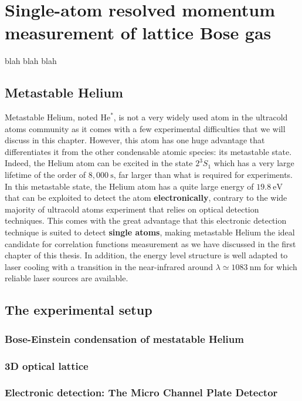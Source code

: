 \chapter{Single-atom resolved momentum measurement of lattice Bose gas}

blah blah blah

\section{Metastable Helium}

Metastable Helium, noted $\mathrm{He}^*$, is not a very widely used atom in the ultracold atoms community as it comes with a few experimental difficulties that we will discuss in this chapter. However, this atom has one huge advantage that differentiates it from the other condensable atomic species: its metastable state. Indeed, the Helium atom can be excited in the state $2^3 S_1$ which has a very large lifetime of the order of $8,000 \ \mathrm{s}$, far larger than what is required for experiments. In this metastable state, the Helium atom has a quite large energy of $19.8 \ \mathrm{eV}$ that can be exploited to detect the atom \textbf{electronically}, contrary to the wide majority of ultracold atoms experiment that relies on optical detection techniques. This comes with the great advantage that this electronic detection technique is suited to detect \textbf{single atoms}, making metastable Helium the ideal candidate for correlation functions measurement as we have discussed in the first chapter of this thesis. In addition, the energy level structure is well adapted to laser cooling with a transition in the near-infrared around $\lambda \simeq 1083 \ \mathrm{nm}$ for which reliable laser sources are available.

\section{The experimental setup}

\subsection{Bose-Einstein condensation of mestatable Helium}

\subsection{3D optical lattice}

\subsection{Electronic detection: The Micro Channel Plate Detector}

